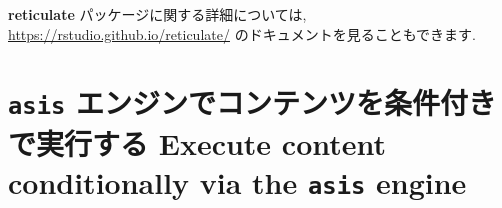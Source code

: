 \documentclass[
  11pt,
]{bxjsreport}
\newenvironment{Shaded}{\begin{snugshade}}{\end{snugshade}}
\newcommand{\InformationTok}[1]{\textcolor[rgb]{0.56,0.35,0.01}{\textbf{\textit{#1}}}}
\newcommand{\NormalTok}[1]{#1}
\begin{document}
\begin{Shaded}
\end{Shaded}

\textbf{reticulate} パッケージに関する詳細については, \url{https://rstudio.github.io/reticulate/} のドキュメントを見ることもできます.

\hypertarget{eng-asis}{%
\section{\texorpdfstring{\texttt{asis} エンジンでコンテンツを条件付きで実行する Execute content conditionally via the \texttt{asis} engine}{asis エンジンでコンテンツを条件付きで実行する Execute content conditionally via the asis engine}}\label{eng-asis}}
\end{document}
